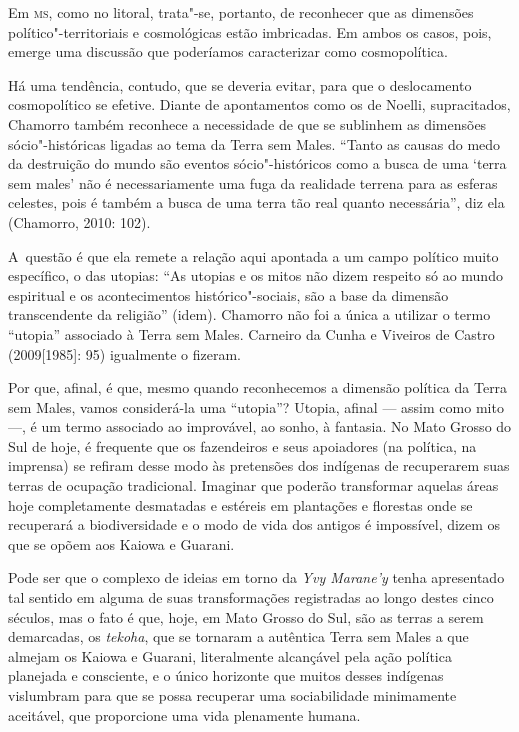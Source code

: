 Em \textsc{ms}, como no litoral, trata"-se, portanto, de reconhecer que as
dimensões político"-territoriais e cosmológicas estão imbricadas. Em
ambos os casos, pois, emerge uma discussão que poderíamos caracterizar
como cosmopolítica.

Há uma tendência, contudo, que se deveria evitar, para que o
deslocamento cosmopolítico se efetive. Diante de apontamentos como os
de Noelli, supracitados, Chamorro também reconhece a necessidade de que
se sublinhem as dimensões sócio"-históricas ligadas ao tema da Terra sem
Males. ``Tanto as causas do medo da destruição do mundo são eventos
sócio"-históricos como a busca de uma ‘terra sem males’ não é
necessariamente uma fuga da realidade terrena para as esferas celestes,
pois é também a busca de uma terra tão real quanto necessária'', diz ela
(Chamorro, 2010: 102). 

A~questão é que ela remete a relação aqui apontada a um campo político
muito específico, o das utopias: ``As utopias e os mitos não dizem
respeito só ao mundo espiritual e os acontecimentos histórico"-sociais,
são a base da dimensão transcendente da religião'' (idem). Chamorro não
foi a única a utilizar o termo ``utopia'' associado à Terra sem Males.
Carneiro da Cunha e Viveiros de Castro (2009[1985]: 95) igualmente o
fizeram. 

Por que, afinal, é que, mesmo quando reconhecemos a dimensão política da
Terra sem Males, vamos considerá-la uma ``utopia''? Utopia, afinal ---
assim como mito ---, é um termo associado ao improvável, ao sonho, à
fantasia. No Mato Grosso do Sul de hoje, é frequente que os fazendeiros
e seus apoiadores (na política, na imprensa) se refiram desse modo às
pretensões dos indígenas de recuperarem suas terras de ocupação
tradicional. Imaginar que poderão transformar aquelas áreas hoje
completamente desmatadas e estéreis em plantações e florestas onde se
recuperará a biodiversidade e o modo de vida dos antigos é impossível,
dizem os que se opõem aos Kaiowa e Guarani.

Pode ser que o complexo de ideias em torno da \emph{Yvy Marane’y} tenha
apresentado tal sentido em alguma de suas transformações registradas ao
longo destes cinco séculos, mas o fato é que, hoje, em Mato Grosso do
Sul, são as terras a serem demarcadas, os \emph{tekoha}, que se tornaram a
autêntica Terra sem Males a que almejam os Kaiowa e Guarani,
literalmente alcançável pela ação política planejada e consciente, e o
único horizonte que muitos desses indígenas vislumbram para que se
possa recuperar uma sociabilidade minimamente aceitável, que
proporcione uma vida plenamente humana.

